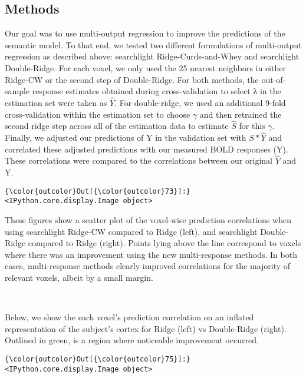 \documentclass{article}
\begin{document}
\subsection{Methods}\label{methods}

Our goal was to use multi-output regression to improve the predictions
of the semantic model. To that end, we tested two different formulations
of multi-output regression as described above: searchlight
Ridge-Curds-and-Whey and searchlight Double-Ridge. For each voxel, we
only used the 25 nearest neighbors in either Ridge-CW or the second step
of Double-Ridge. For both methods, the out-of-sample response estimates
obtained during cross-validation to select λ in the estimation set were
taken as \(\hat Y\). For double-ridge, we used an additional 9-fold
cross-validation within the estimation set to choose \(\gamma\) and then
retrained the second ridge step across all of the estimation data to
estimate \(\hat S\) for this \(\gamma\). Finally, we adjusted our
predictions of Y in the validation set with \(S*\hat Y\) and correlated
these adjusted predictions with our measured BOLD responses (Y). These
correlations were compared to the correlations between our original
\(\hat Y\) and Y.


            \begin{Verbatim}[commandchars=\\\{\}]
{\color{outcolor}Out[{\color{outcolor}73}]:} <IPython.core.display.Image object>
\end{Verbatim}
        
    These figures show a scatter plot of the voxel-wise prediction
correlations when using searchlight Ridge-CW compared to Ridge (left),
and searchlight Double-Ridge compared to Ridge (right). Points lying
above the line correspond to voxels where there was an improvement using
the new multi-response methods. In both cases, multi-response methods
clearly improved correlations for the majority of relevant voxels,
albeit by a small margin.


    \begin{center}
    \end{center}
    { \hspace*{\fill} \\}
    
    Below, we show the each voxel's prediction correlation on an inflated
representation of the subject's cortex for Ridge (left) vs Double-Ridge
(right). Outlined in green, is a region where noticeable improvement
occurred.


            \begin{Verbatim}[commandchars=\\\{\}]
{\color{outcolor}Out[{\color{outcolor}75}]:} <IPython.core.display.Image object>
\end{Verbatim}
        


    
    
    
\end{document}
